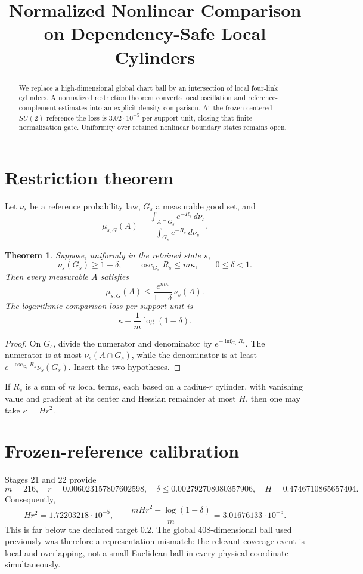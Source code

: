 \documentclass[11pt]{article}
\title{Normalized Nonlinear Comparison on Dependency-Safe Local Cylinders}
\author{}
\date{}
\newtheorem{theorem}{Theorem}
\begin{document}
\maketitle

\begin{abstract}
We replace a high-dimensional global chart ball by an intersection of local
four-link cylinders.  A normalized restriction theorem converts local
oscillation and reference-complement estimates into an explicit density
comparison.  At the frozen centered $SU(2)$ reference the loss is
$3.02\cdot10^{-5}$ per support unit, closing that finite normalization gate.
Uniformity over retained nonlinear boundary states remains open.
\end{abstract}

\section{Restriction theorem}
Let $\nu_s$ be a reference probability law, $G_s$ a measurable good set, and
\[
 \mu_{s,G}(A)=
 \frac{\int_{A\cap G_s}e^{-R_s}\,d\nu_s}
      {\int_{G_s}e^{-R_s}\,d\nu_s}.
\]

\begin{theorem}
Suppose, uniformly in the retained state $s$,
\[
 \nu_s(G_s)\ge 1-\delta,
 \qquad \operatorname{osc}_{G_s}R_s\le m\kappa,
 \qquad 0\le\delta<1.
\]
Then every measurable $A$ satisfies
\[
 \mu_{s,G}(A)
 \le \frac{e^{m\kappa}}{1-\delta}\,\nu_s(A).
\]
The logarithmic comparison loss per support unit is
\[
 \kappa-\frac1m\log(1-\delta).
\]
\end{theorem}
\begin{proof}
On $G_s$, divide the numerator and denominator by
$e^{-\inf_{G_s}R_s}$.  The numerator is at most $\nu_s(A\cap G_s)$,
while the denominator is at least
$e^{-\operatorname{osc}_{G_s}R_s}\nu_s(G_s)$.  Insert the two hypotheses.
\end{proof}

If $R_s$ is a sum of $m$ local terms, each based on a radius-$r$ cylinder,
with vanishing value and gradient at its center and Hessian remainder at most
$H$, then one may take $\kappa=Hr^2$.

\section{Frozen-reference calibration}
Stages 21 and 22 provide
\[
 m=216,\quad r=0.006023157807602598,\quad
 \delta\le0.002792708080357906,
 \quad H=0.4746710865657404.
\]
Consequently,
\[
 Hr^2=1.72203218\cdot10^{-5},\qquad
 \frac{mHr^2-\log(1-\delta)}m
 =3.01676133\cdot10^{-5}.
\]
This is far below the declared target $0.2$.  The global $408$-dimensional
ball used previously was therefore a representation mismatch: the relevant
coverage event is local and overlapping, not a small Euclidean ball in every
physical coordinate simultaneously.
\end{document}
